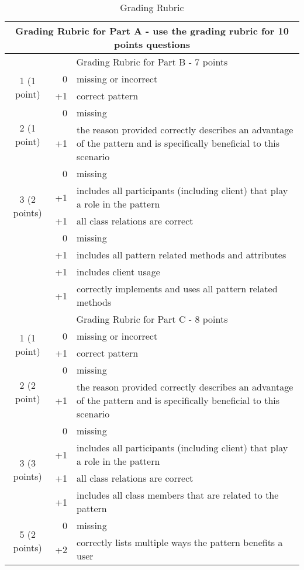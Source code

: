 \begin{table}[t]
	\caption{Grading Rubric }
	\label{rubricS2}
    \centering
    \begin{tabular}{|c|r|p{}|}
        \hline
	\multicolumn{3}{|c|}{Grading Rubric for Part A - use the grading rubric for 10 points questions}\\
        \hline
        \hline
	\multicolumn{3}{|c|}{Grading Rubric for Part B - 7 points}\\
        \hline
	    \multirow{2}{*}{1 (1 point)} & 0 & missing or incorrect \\
	    \cline{2-3}
	    & +1 & correct pattern \\
        \hline
	    \multirow{2}{*}{2 (1 point)} & 0 & missing \\
	    \cline{2-3}
	    & +1 & the reason provided correctly describes an advantage of the pattern and is specifically beneficial to this scenario \\
        \hline
	    \multirow{4}{*}{3 (2 points)} & 0 & missing \\
	    \cline{2-3}
	    & +1 & includes all participants (including client) that play a role in the pattern \\
	    \cline{2-3}
	    & +1 & all class relations are correct \\
        \hline
	    \multirow{4}{*}{4 (3 points)} & 0 & missing \\
	    \cline{2-3}
	    & +1 & includes all pattern related methods and attributes \\
	    \cline{2-3}
	    & +1 & includes client usage \\
	    \cline{2-3}
	    & +1 & correctly implements and uses all pattern related methods \\
        \hline
        \hline
	\multicolumn{3}{|c|}{Grading Rubric for Part C - 8 points}\\
        \hline
        \hline
	    \multirow{2}{*}{1 (1 point)} & 0 & missing or incorrect \\
	    \cline{2-3}
	    & +1 & correct pattern \\
        \hline
	    \multirow{2}{*}{2 (2 point)} & 0 & missing \\
	    \cline{2-3}
	    & +1 & the reason provided correctly describes an advantage of the pattern and is specifically beneficial to this scenario \\
        \hline
	    \multirow{4}{*}{3 (3 points)} & 0 & missing \\
	    \cline{2-3}
	    & +1 & includes all participants (including client) that play a role in the pattern \\
	    \cline{2-3}
	    & +1 & all class relations are correct \\
	    \cline{2-3}
	    & +1 & includes all class members that are related to the pattern \\
        \hline
	    \multirow{2}{*}{5 (2 points)} & 0 & missing \\
	    \cline{2-3}
	    & +2 & correctly lists multiple ways the pattern benefits a user \\
        \hline
    \end{tabular}
\end{table}
